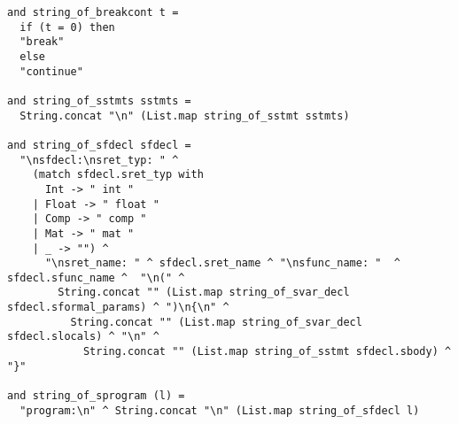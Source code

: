 \begin{lstlisting}
and string_of_breakcont t =
  if (t = 0) then
  "break"
  else
  "continue"

and string_of_sstmts sstmts = 
  String.concat "\n" (List.map string_of_sstmt sstmts) 

and string_of_sfdecl sfdecl =
  "\nsfdecl:\nsret_typ: " ^ 
    (match sfdecl.sret_typ with
      Int -> " int "
    | Float -> " float "
    | Comp -> " comp "
    | Mat -> " mat "
    | _ -> "") ^
      "\nsret_name: " ^ sfdecl.sret_name ^ "\nsfunc_name: "  ^ sfdecl.sfunc_name ^  "\n(" ^
        String.concat "" (List.map string_of_svar_decl sfdecl.sformal_params) ^ ")\n{\n" ^
          String.concat "" (List.map string_of_svar_decl sfdecl.slocals) ^ "\n" ^
            String.concat "" (List.map string_of_sstmt sfdecl.sbody) ^ "}"
 
and string_of_sprogram (l) = 
  "program:\n" ^ String.concat "\n" (List.map string_of_sfdecl l)
\end{lstlisting}

